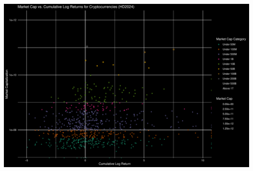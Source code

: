 \documentclass[
]{article}
\begin{document}
\includegraphics{Crypto_ETL_files/figure-latex/unnamed-chunk-10-1.pdf}
\end{document}
